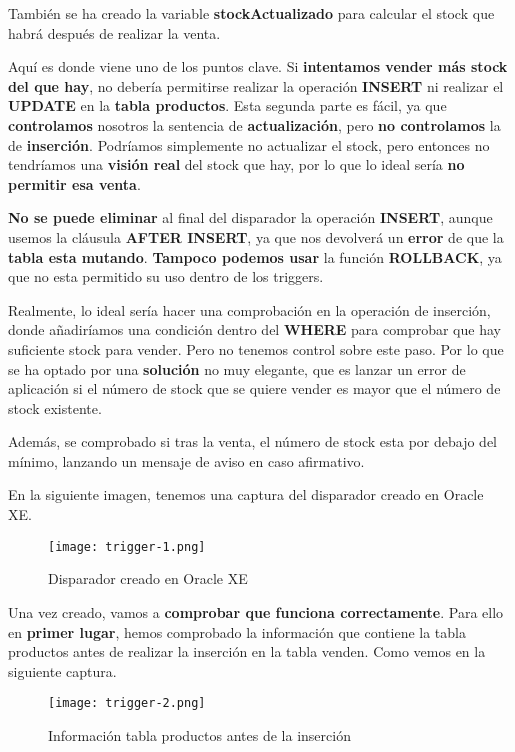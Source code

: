 \begin{enumerate}[label=\Alph*)]
    También se ha creado la variable \textbf{stockActualizado} para calcular el stock que habrá después de realizar la venta.

    Aquí es donde viene uno de los puntos clave. Si \textbf{intentamos vender más stock del que hay}, no debería permitirse realizar la operación \textbf{INSERT} ni realizar el \textbf{UPDATE} en la \textbf{tabla productos}. Esta segunda parte es fácil, ya que \textbf{controlamos} nosotros la sentencia de \textbf{actualización}, pero \textbf{no controlamos} la de \textbf{inserción}. Podríamos simplemente no actualizar el stock, pero entonces no tendríamos una \textbf{visión real} del stock que hay, por lo que lo ideal sería \textbf{no permitir esa venta}.

    \textbf{No se puede eliminar} al final del disparador la operación \textbf{INSERT}, aunque usemos la cláusula \textbf{AFTER INSERT}, ya que nos devolverá un \textbf{error} de que la \textbf{tabla esta mutando}. \textbf{Tampoco podemos usar} la función \textbf{ROLLBACK}, ya que no esta permitido su uso dentro de los triggers.

    Realmente, lo ideal sería hacer una comprobación en la operación de inserción, donde añadiríamos una condición dentro del \textbf{WHERE} para comprobar que hay suficiente stock para vender. Pero no tenemos control sobre este paso. Por lo que se ha optado por una \textbf{solución} no muy elegante, que es lanzar un error de aplicación si el número de stock que se quiere vender es mayor que el número de stock existente.

    Además, se comprobado si tras la venta, el número de stock esta por debajo del mínimo, lanzando un mensaje de aviso en caso afirmativo.

    En la siguiente imagen, tenemos una captura del disparador creado en Oracle XE.

    \begin{figure}[H]
        \centering
        \texttt{[image: trigger-1.png]}
        \caption{Disparador creado en Oracle XE}
    \end{figure}

    Una vez creado, vamos a \textbf{comprobar que funciona correctamente}. Para ello en \textbf{primer lugar}, hemos comprobado la información que contiene la tabla productos antes de realizar la inserción en la tabla venden. Como vemos en la siguiente captura.

    \begin{figure}[H]
        \centering
        \texttt{[image: trigger-2.png]}
        \caption{Información tabla productos antes de la inserción}
    \end{figure}


\end{enumerate}
